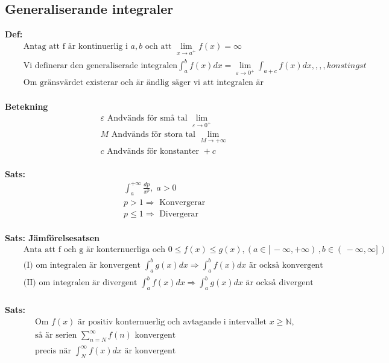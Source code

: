 \newpage


\subsection{Generaliserande integraler}
\textbf{Def: }
\begin{align*}
  &\quad  \text{Antag att f är kontinuerlig i } a,b \text{ och att }  \lim_{x \to a^+} f(x) = \infty \\
  &\quad  \text{Vi definerar den generaliserade integralen} \int_a^b f(x) dx
  = \lim_{\varepsilon \to 0^+} \int_{a+c}f(x) dx ,,,,konstingst \\
  &\quad  \text{Om gränsvärdet existerar och är ändlig säger vi att integralen är konvergentn,
  anart är den divergent} \\
\end{align*}

\textbf{Betekning}
\begin{align*}
  &\quad  \varepsilon \text{ Andvänds för små tal }  \lim_{\varepsilon \to 0^+} \\
  &\quad  M \text{ Andvänds för stora tal } \lim_{M \to +\infty} \\
  &\quad  c \text{ Andvänds för konstanter } +c \\
\end{align*}

\textbf{Sats: }
\begin{align*}
  &\quad  \int_a^{+\infty} \frac{dp}{x^p}, \; a>0 \\
  &\quad  p > 1 \Rightarrow \text{ Konvergerar} \\
  &\quad  p \leq 1 \Rightarrow \text{ Divergerar} \\
\end{align*}

\textbf{Sats: Jämförelsesatsen}
\begin{align*}
  &\quad  \text{Anta att f och g är konternuerliga och } 0 \leq f(x) \leq g(x),
  ( a \in [ \, -\infty,+\infty ) \, , b \in ( \, -\infty,\infty ] \, )\\
  &\quad  \text{(I) om integralen är konvergent } \int_a^b g(x)dx \Rightarrow \int_a^b f(x)dx
  \text{ är också konvergent} \\
  &\quad \text{(II) om integralen är divergent } \int_a^b f(x)dx \Rightarrow \int_a^b g(x)dx
  \text{ är också divergent} \\
\end{align*}

\textbf{Sats: }
\begin{align*}
  &\quad  \text{Om $f(x)$ är positiv konternuerlig och avtagande i intervallet $x\geq\mathbb{N}$,} \\
  &\quad  \text{så är serien }  \displaystyle\sum_{n=N}^{\infty} f(n) \text{ konvergent} \\ 
  &\quad  \text{precis när  }  \int_N^{\infty} f(x)dx \text{ är konvergent} \\
\end{align*}

